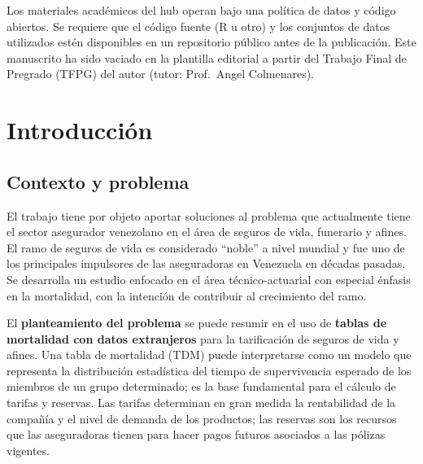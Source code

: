\documentclass[
  11pt,
  a4paper,
]{article}
\begin{document}
\begin{tcolorbox}[enhanced jigsaw, rightrule=.15mm, colbacktitle=quarto-callout-note-color!10!white, colback=white, colframe=quarto-callout-note-color-frame, coltitle=black, breakable, leftrule=.75mm, title={Reproducibilidad}, toprule=.15mm, titlerule=0mm, bottomtitle=1mm, arc=.35mm, toptitle=1mm, opacitybacktitle=0.6, left=2mm, bottomrule=.15mm, opacityback=0]

Los materiales académicos del hub operan bajo una política de datos y
código abiertos. Se requiere que el código fuente (R u otro) y los
conjuntos de datos utilizados estén disponibles en un repositorio
público antes de la publicación. Este manuscrito ha sido vaciado en la
plantilla editorial a partir del Trabajo Final de Pregrado (TFPG) del
autor (tutor: Prof.~Angel Colmenares).

\end{tcolorbox}

\section{Introducción}\label{introducciuxf3n}

\subsection{Contexto y problema}\label{contexto-y-problema}

El trabajo tiene por objeto aportar soluciones al problema que
actualmente tiene el sector asegurador venezolano en el área de seguros
de vida, funerario y afines. El ramo de seguros de vida es considerado
``noble'' a nivel mundial y fue uno de los principales impulsores de las
aseguradoras en Venezuela en décadas pasadas. Se desarrolla un estudio
enfocado en el área técnico-actuarial con especial énfasis en la
mortalidad, con la intención de contribuir al crecimiento del ramo.

El \textbf{planteamiento del problema} se puede resumir en el uso de
\textbf{tablas de mortalidad con datos extranjeros} para la tarificación
de seguros de vida y afines. Una tabla de mortalidad (TDM) puede
interpretarse como un modelo que representa la distribución estadística
del tiempo de supervivencia esperado de los miembros de un grupo
determinado; es la base fundamental para el cálculo de tarifas y
reservas. Las tarifas determinan en gran medida la rentabilidad de la
compañía y el nivel de demanda de los productos; las reservas son los
recursos que las aseguradoras tienen para hacer pagos futuros asociados
a las pólizas vigentes.
\end{document}
